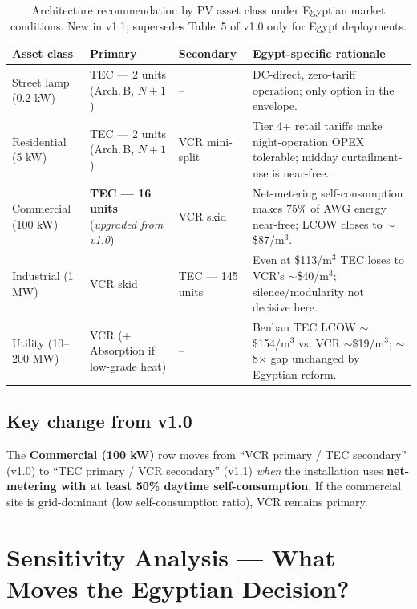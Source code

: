 \documentclass[11pt,a4paper]{article}
\begin{document}
\begin{table}[h]
\centering\small
\caption{Architecture recommendation by PV asset class under Egyptian market conditions. New in v1.1; supersedes Table~5 of v1.0 only for Egypt deployments.}
\label{tab:updated_recos}
\begin{tabular}{@{}lllp{6.8cm}@{}}
\toprule
\textbf{Asset class} & \textbf{Primary} & \textbf{Secondary} & \textbf{Egypt-specific rationale}\\
\midrule
Street lamp (0.2 kW) & TEC --- 2 units (Arch.\,B, $N{+}1$) & -- & DC-direct, zero-tariff operation; only option in the envelope.\\
Residential (5 kW)   & TEC --- 2 units (Arch.\,B, $N{+}1$) & VCR mini-split & Tier 4+ retail tariffs make night-operation OPEX tolerable; midday curtailment-use is near-free.\\
Commercial (100 kW)  & \textbf{TEC --- 16 units} (\emph{upgraded from v1.0}) & VCR skid & Net-metering self-consumption makes 75\% of AWG energy near-free; LCOW closes to $\sim$\$87/m$^3$.\\
Industrial (1 MW)    & VCR skid & TEC --- 145 units & Even at \$113/m$^3$ TEC loses to VCR's $\sim$\$40/m$^3$; silence/modularity not decisive here.\\
Utility (10--200 MW) & VCR (+ Absorption if low-grade heat) & -- & Benban TEC LCOW $\sim$\$154/m$^3$ vs. VCR $\sim$\$19/m$^3$; $\sim$8$\times$ gap unchanged by Egyptian reform.\\
\bottomrule
\end{tabular}
\end{table}

\subsection{Key change from v1.0}
The \textbf{Commercial (100 kW)} row moves from ``VCR primary / TEC secondary'' (v1.0) to ``TEC primary / VCR secondary'' (v1.1) \emph{when} the installation uses \textbf{net-metering with at least 50\% daytime self-consumption}. If the commercial site is grid-dominant (low self-consumption ratio), VCR remains primary.

\section{Sensitivity Analysis --- What Moves the Egyptian Decision?}
\label{sec:egy_sensitivity}
\end{document}
